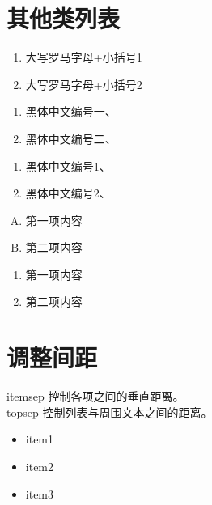 \documentclass[a4paper, UTF-8,14pt]{ctexart}
\begin{document}
	
	\section*{其他类列表}
	\begin{enumerate}[label=(\Roman*)]
		\item 大写罗马字母+小括号1
		\item 大写罗马字母+小括号2 
	\end{enumerate}
	
	\begin{enumerate}[label=\heiti\chinese*、]
		\item 黑体中文编号一、
		\item 黑体中文编号二、
	\end{enumerate}
	
	\begin{enumerate}[label=\heiti\arabic*、]
		\item 黑体中文编号1、
		\item 黑体中文编号2、
	\end{enumerate}
	
	\begin{enumerate}[A.]
		\item 第一项内容
		\item 第二项内容
	\end{enumerate}
	
	\begin{enumerate}[\heiti a.]
		\item 第一项内容
		\item 第二项内容
	\end{enumerate}

	\section*{调整间距}
	\noindent itemsep 控制各项之间的垂直距离。\\
	topsep 控制列表与周围文本之间的距离。
	\begin{itemize}[itemsep=-0.4em,topsep=0pt,parsep=0pt]
		\item item1
		\item item2
		\item item3
	\end{itemize}
\end{document}
